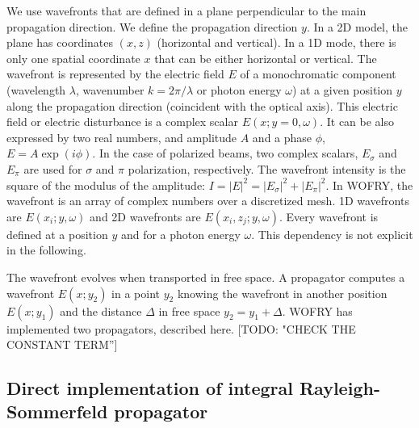 \documentclass{iopconfser}
\newcommand{\todo}[1]{{\color{red}[TODO: "#1'']}}
\begin{document}
We use wavefronts that are defined in a plane perpendicular to the main propagation direction. We define the propagation direction $y$. In a 2D model, the plane has coordinates $(x,z)$ (horizontal and vertical). In a 1D mode, there is only one spatial coordinate $x$ that can be either horizontal or vertical. 
The wavefront is represented by the electric field $E$ of a monochromatic component (wavelength $\lambda$, wavenumber $k = 2 \pi / \lambda$ or photon energy $\omega$) at a given position $y$ along the propagation direction (coincident with the optical axis).
This electric field or electric disturbance is a complex scalar $E(x;y=0,\omega)$. It can be also expressed by two real numbers, and amplitude $A$ and a phase $\phi$,  $E= A \exp{(i\phi)}$. In the case of polarized beams, two complex scalars, $E_\sigma$ and $E_\pi$ are used for $\sigma$ and $\pi$ polarization, respectively.
The wavefront intensity is the square of the modulus of the amplitude: $I=|E|^2=|E_\sigma|^2 + |E_\pi|^2$. In WOFRY, the wavefront is an array of complex numbers over a discretized mesh. 1D wavefronts are $E(x_i;y,\omega)$ and 2D wavefronts are $E(x_i,z_j;y,\omega)$. Every wavefront is defined at a position $y$ and for a photon energy $\omega$. This dependency is not explicit in the following.

The wavefront evolves when transported in free space. A propagator computes a wavefront $E(x;y_2)$ in a point $y_2$ knowing the wavefront in another position $E(x;y_1)$ and the distance $\Delta$ in free space $y_2 = y_1 + \Delta$. WOFRY has implemented two propagators, described here. \todo{CHECK THE CONSTANT TERM}

\subsection{Direct implementation of integral Rayleigh-Sommerfeld propagator}
\label{sec:integralPropagator}
\end{document}
